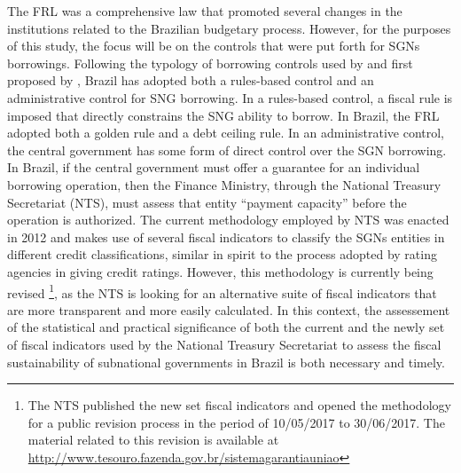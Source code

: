 The FRL was a comprehensive law that promoted several changes in the institutions related to the Brazilian budgetary process. However, for the purposes of this study, the focus will be on the controls that were put forth for SGNs borrowings. Following the typology of borrowing controls used by \citet{ahmad2005} and first proposed by \citet{ter1997}, Brazil has adopted both a rules-based control and an administrative control for SNG borrowing. In a rules-based control, a fiscal rule is imposed that directly constrains the SNG ability to borrow. In Brazil, the FRL adopted both a golden rule and a debt ceiling rule. In an administrative control, the central government has some form of direct control over the SGN borrowing. In Brazil, if the central government must offer a guarantee for an individual borrowing operation, then the Finance Ministry, through the National Treasury Secretariat (NTS), must assess that entity ``payment capacity'' before the operation is authorized. The current methodology employed by NTS was enacted in 2012 and makes use of several fiscal indicators to classify the SGNs entities in different credit classifications, similar in spirit to the process adopted by rating agencies in giving credit ratings. However, this methodology is currently being revised \footnote{The NTS published the new set fiscal indicators and opened the methodology for a public revision process in the period of 10/05/2017 to 30/06/2017. The material related to this revision is available at \url{http://www.tesouro.fazenda.gov.br/sistemagarantiauniao}}, as the NTS is looking for an alternative suite of fiscal indicators that are more transparent and more easily calculated. In this context, the assessement of the statistical and practical significance of both the current and the newly set of fiscal indicators used by the National Treasury Secretariat to assess the fiscal sustainability of subnational governments in Brazil is both necessary and timely. 


